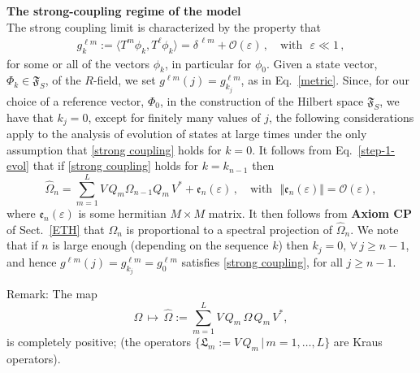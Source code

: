 \documentclass[12pt]{article}
\begin{document}
{{\bf{The strong-coupling regime of the model}}\\

The strong coupling limit is characterized by the property that
\begin{align}\label{strong coupling}
g_{k}^ {\ell m} := \langle T^{m} \phi_{k}, T^{\ell} \phi_{k} \rangle = \delta^{\,\ell m} + \mathcal{O}(\varepsilon)\,, \quad \text{with }\,\,\varepsilon \ll 1\,,
\end{align}
for some or all of the vectors $\phi_{k}$, in particular for $\phi_0$. Given a state vector,
$\Phi_{{k}}\in \mathfrak{F}_S$, of the $R$-field, we set $g^{\ell m}(j)= g_{k_j}^{\ell m}$,
as in Eq.~\eqref{metric}. Since, for our choice of a reference vector, $\Phi_{{0}}$, in the construction
of the Hilbert space $\mathfrak{F}_S$, we have that $k_j = 0$, except for finitely many values of $j$,
the following considerations apply to the analysis of evolution of states at large times under the only assumption that \eqref{strong coupling} holds for $k =0$.
It follows from Eq.~\eqref{step-1-evol} that if \eqref{strong coupling} holds for $k=k_{n-1}$ then
\begin{equation}\label{Markovian}
\widehat{\Omega}_n = \sum_{m=1}^{L} V\,Q_m \Omega_{n-1} Q_m \,V^{*}+ \mathfrak{e}_{n}(\varepsilon)\,, \quad \text{with }
\,\, \Vert \mathfrak{e}_{n}(\varepsilon) \Vert = \mathcal{O}(\varepsilon),
\end{equation}
where $\mathfrak{e}_n(\varepsilon)$ is some hermitian $M\times M$ matrix. It then follows from {\bf{Axiom CP}}
of Sect.~\ref{ETH}  that $\Omega_n$ is proportional to a spectral projection of $\widehat{\Omega}_n$.
We note that if $n$ is large enough (depending on the sequence ${k}$) then $k_j =0, \,\forall \, j\geq n-1$,
and hence $g^{\ell m}(j) = g_{k_j}^{\ell m} = g_{0}^{\ell m}$ satisfies \eqref{strong coupling}, for all $j \geq n-1$.

{Remark}: The map
\begin{equation}\label{CP}
\Omega\, \mapsto\, \widehat{\Omega} := \sum_{m =1}^{L} V\,Q_{m}\, \Omega \, Q_{m} \, V^{*},
\end{equation}
is completely positive; (the operators $\big\{\mathfrak{L}_{m}:=V\,Q_{m}\,\vert\, m=1,\dots, L\big\}$ are Kraus operators). \\

}
\end{document}
